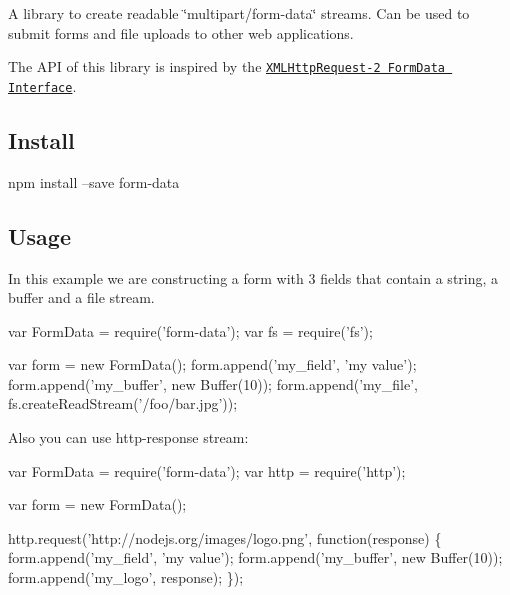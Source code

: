 A library to create readable {\ttfamily \char`\"{}multipart/form-\/data\char`\"{}} streams. Can be used to submit forms and file uploads to other web applications.

The A\+PI of this library is inspired by the \href{http://dev.w3.org/2006/webapi/XMLHttpRequest-2/Overview.html#the-formdata-interface}{\tt X\+M\+L\+Http\+Request-\/2 Form\+Data Interface}.

\href{https://travis-ci.org/form-data/form-data}{\tt } \href{https://travis-ci.org/form-data/form-data}{\tt } \href{https://ci.appveyor.com/project/alexindigo/form-data}{\tt }

\href{https://coveralls.io/github/form-data/form-data?branch=master}{\tt } \href{https://david-dm.org/form-data/form-data}{\tt } \href{https://www.bithound.io/github/form-data/form-data}{\tt }

\subsection*{Install}


\begin{DoxyCode}
npm install --save form-data
\end{DoxyCode}


\subsection*{Usage}

In this example we are constructing a form with 3 fields that contain a string, a buffer and a file stream.


\begin{DoxyCode}
var FormData = require('form-data');
var fs = require('fs');

var form = new FormData();
form.append('my\_field', 'my value');
form.append('my\_buffer', new Buffer(10));
form.append('my\_file', fs.createReadStream('/foo/bar.jpg'));
\end{DoxyCode}


Also you can use http-\/response stream\+:


\begin{DoxyCode}
var FormData = require('form-data');
var http = require('http');

var form = new FormData();

http.request('http://nodejs.org/images/logo.png', function(response) \{
  form.append('my\_field', 'my value');
  form.append('my\_buffer', new Buffer(10));
  form.append('my\_logo', response);
\});
\end{DoxyCode}


